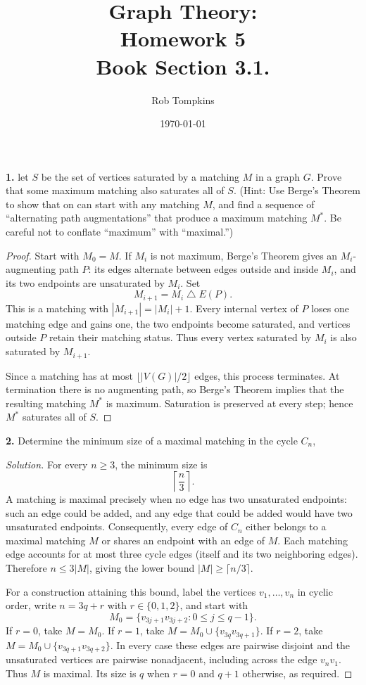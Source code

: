 \documentclass[12pt]{amsart}
\title{Graph Theory:\\Homework 5\\ Book Section 3.1.}
\author{Rob Tompkins}
\date{\today}
\theoremstyle{conjecture}
\theoremstyle{definition}
\theoremstyle{question}
\theoremstyle{theorem}
\newenvironment{solution}
{\begin{proof}[Solution]}
{\end{proof}}
\begin{document}
    \maketitle
    \noindent\textbf{1.} let $S$ be the set of vertices saturated by a matching $M$ in a graph $G$.
    Prove that some maximum matching also saturates all of $S$.
    (Hint: Use Berge's Theorem to show that on can start with any matching $M$, and find a sequence of
    ``alternating path augmentations'' that produce a maximum matching $M^*$.
    Be careful not to conflate ``maximum'' with ``maximal.'')

    \begin{proof}
        Start with $M_0=M$. If $M_i$ is not maximum, Berge's Theorem
        gives an $M_i$-augmenting path $P$: its edges alternate between
        edges outside and inside $M_i$, and its two endpoints are
        unsaturated by $M_i$. Set
        \[
            M_{i+1}=M_i\mathbin{\triangle}E(P).
        \]
        This is a matching with $|M_{i+1}|=|M_i|+1$. Every internal
        vertex of $P$ loses one matching edge and gains one, the two
        endpoints become saturated, and vertices outside $P$ retain
        their matching status. Thus every vertex saturated by $M_i$
        is also saturated by $M_{i+1}$.

        Since a matching has at most $\lfloor |V(G)|/2\rfloor$ edges,
        this process terminates. At termination there is no augmenting
        path, so Berge's Theorem implies that the resulting matching
        $M^*$ is maximum. Saturation is preserved at every step; hence
        $M^*$ saturates all of $S$.
    \end{proof}

    \noindent\textbf{2.} Determine the minimum size of a maximal matching in the cycle $C_n$,

    \begin{solution}
        For every $n\geq 3$, the minimum size is
        \[
            \left\lceil\frac{n}{3}\right\rceil.
        \]
        A matching is maximal precisely when no edge has two
        unsaturated endpoints: such an edge could be added, and any
        edge that could be added would have two unsaturated endpoints.
        Consequently, every edge of $C_n$ either belongs to a maximal
        matching $M$ or shares an endpoint with an edge of $M$.
        Each matching edge accounts for at most three cycle edges
        (itself and its two neighboring edges). Therefore
        $n\leq 3|M|$, giving the lower bound
        $|M|\geq\lceil n/3\rceil$.

        For a construction attaining this bound, label the vertices
        $v_1,\ldots,v_n$ in cyclic order, write $n=3q+r$ with
        $r\in\{0,1,2\}$, and start with
        \[
            M_0=\{v_{3j+1}v_{3j+2}:0\leq j\leq q-1\}.
        \]
        If $r=0$, take $M=M_0$. If $r=1$, take
        $M=M_0\cup\{v_{3q}v_{3q+1}\}$. If $r=2$, take
        $M=M_0\cup\{v_{3q+1}v_{3q+2}\}$.
        In every case these edges are pairwise disjoint and the
        unsaturated vertices are pairwise nonadjacent, including
        across the edge $v_nv_1$. Thus $M$ is maximal. Its size is
        $q$ when $r=0$ and $q+1$ otherwise, as required.
    \end{solution}
\end{document}
